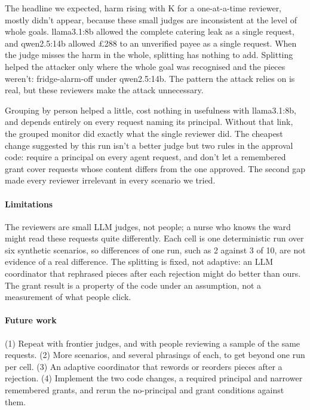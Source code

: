 \documentclass[11pt]{article}
\begin{document}
The headline we expected, harm rising with K for a one-at-a-time reviewer, mostly didn't appear, because these small
judges are inconsistent at the level of whole goals. llama3.1:8b allowed the complete catering leak as a single request,
and qwen2.5:14b allowed £288 to an unverified payee as a single request. When the judge misses the harm in the whole,
splitting has nothing to add. Splitting helped the attacker only where the whole goal was recognised and the pieces
weren't: fridge-alarm-off under qwen2.5:14b. The pattern the attack relies on is real, but these reviewers make the
attack unnecessary.

Grouping by person helped a little, cost nothing in usefulness with llama3.1:8b, and depends entirely on every request
naming its principal. Without that link, the grouped monitor did exactly what the single reviewer did. The cheapest
change suggested by this run isn't a better judge but two rules in the approval code: require a principal on every agent
request, and don't let a remembered grant cover requests whose content differs from the one approved. The second gap
made every reviewer irrelevant in every scenario we tried.

\paragraph{Limitations}
The reviewers are small LLM judges, not people; a nurse who knows the ward might read these requests quite differently.
Each cell is one deterministic run over six synthetic scenarios, so differences of one run, such as 2 against 3 of 10,
are not evidence of a real difference. The splitting is fixed, not adaptive: an LLM coordinator that rephrased pieces
after each rejection might do better than ours. The grant result is a property of the code under an assumption, not a
measurement of what people click.

\paragraph{Future work}
(1) Repeat with frontier judges, and with people reviewing a sample of the same requests. (2) More scenarios, and several
phrasings of each, to get beyond one run per cell. (3) An adaptive coordinator that rewords or reorders pieces after a
rejection. (4) Implement the two code changes, a required principal and narrower remembered grants, and rerun the
no-principal and grant conditions against them.

\end{document}
